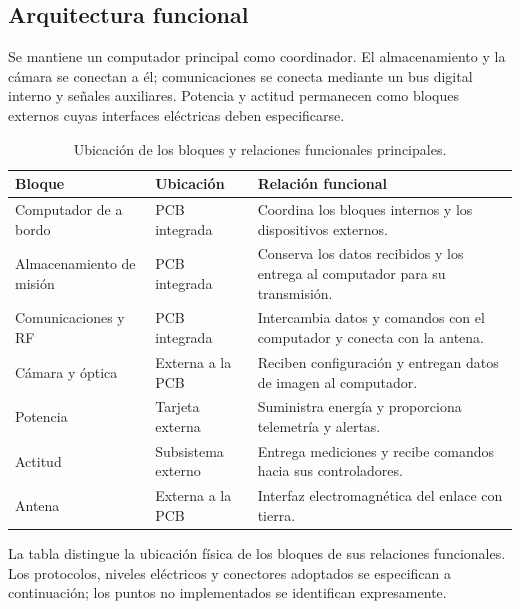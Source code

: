 \documentclass[11pt,letterpaper]{article}
\begin{document}
\subsection{Arquitectura funcional}
Se mantiene un computador principal como coordinador. El almacenamiento y la cámara se conectan a él; comunicaciones se conecta mediante un bus digital interno y señales auxiliares. Potencia y actitud permanecen como bloques externos cuyas interfaces eléctricas deben especificarse.

\begin{table}[htbp]
\centering
\caption{Ubicación de los bloques y relaciones funcionales principales.}
\label{tab:arquitectura}
\begin{tabularx}{\textwidth}{L{3.6cm}L{2.8cm}X}
\toprule Bloque & Ubicación & Relación funcional \\
\midrule
Computador de a bordo & PCB integrada & Coordina los bloques internos y los dispositivos externos. \\
Almacenamiento de misión & PCB integrada & Conserva los datos recibidos y los entrega al computador para su transmisión. \\
Comunicaciones y RF & PCB integrada & Intercambia datos y comandos con el computador y conecta con la antena. \\
Cámara y óptica & Externa a la PCB & Reciben configuración y entregan datos de imagen al computador. \\
Potencia & Tarjeta externa & Suministra energía y proporciona telemetría y alertas. \\
Actitud & Subsistema externo & Entrega mediciones y recibe comandos hacia sus controladores. \\
Antena & Externa a la PCB & Interfaz electromagnética del enlace con tierra. \\
\bottomrule
\end{tabularx}
\end{table}
La tabla distingue la ubicación física de los bloques de sus relaciones
funcionales. Los protocolos, niveles eléctricos y conectores adoptados se especifican a continuación; los puntos no implementados se identifican expresamente.
\end{document}
